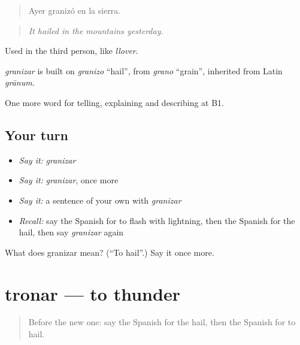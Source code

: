 \begin{quote}
Ayer granizó en la sierra.
\end{quote}

\begin{quote}
\emph{It hailed in the mountains yesterday.}
\end{quote}

Used in the third person, like \emph{llover}.

\begin{cousinweb}
\emph{granizar} is built on \emph{granizo} \textquotedblleft{}hail\textquotedblright{}, from \emph{grano} \textquotedblleft{}grain\textquotedblright{}, inherited from Latin \emph{grānum}.
\end{cousinweb}

\begin{grammarlens}[title={What you've built}]
One more word for telling, explaining and describing at B1.
\end{grammarlens}

\subsection*{Your turn}
\begin{itemize}
\raggedright
  \item \emph{Say it:} \emph{granizar}
  \item \emph{Say it:} \emph{granizar}, once more
  \item \emph{Say it:} a sentence of your own with \emph{granizar}
  \item \emph{Recall:} say the Spanish for to flash with lightning, then the Spanish for the hail, then say \emph{granizar} again
\end{itemize}

\begin{tcolorbox}[breakable,colback=teal!4,colframe=teal!35!black,title={Before you move on}]
What does granizar mean? (\textquotedblleft{}To hail\textquotedblright{}.) Say it once more.
\end{tcolorbox}
\section[tronar]{tronar — to thunder}

\label{lesson:ES-C699-tronar}



\begin{quote}
Before the new one: say the Spanish for the hail, then the Spanish for to hail.
\end{quote}

